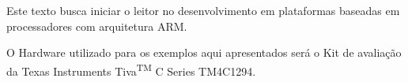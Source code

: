 Este texto busca iniciar o leitor no desenvolvimento em plataformas baseadas em processadores com arquitetura ARM.

O Hardware utilizado para os exemplos aqui apresentados será o Kit de 
avaliação da Texas Instruments Tiva\textsuperscript{TM} C Series TM4C1294.